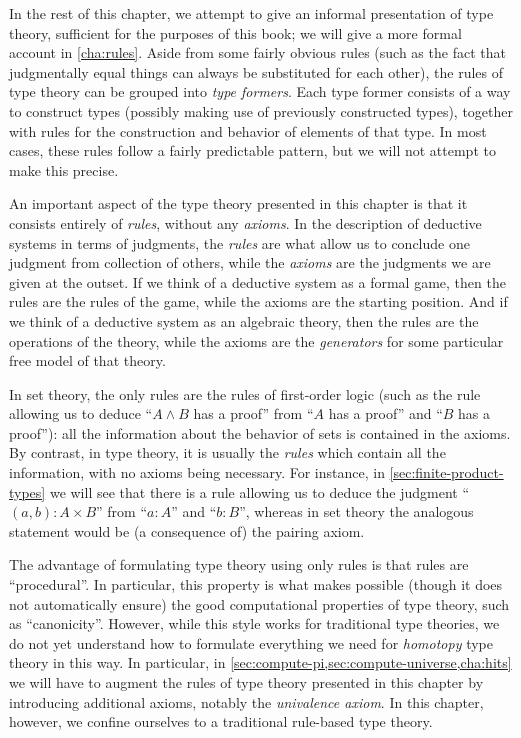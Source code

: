 In the rest of this chapter, we attempt to give an informal presentation of type theory, sufficient for the purposes of this book; we will give a more formal account in \autoref{cha:rules}.
Aside from some fairly obvious rules (such as the fact that judgmentally equal things can always be substituted for each other), the rules of type theory can be grouped into \emph{type formers}.
Each type former consists of a way to construct types (possibly making use of previously constructed types), together with rules for the construction and behavior of elements of that type.
In most cases, these rules follow a fairly predictable pattern, but we will not attempt to make this precise.

%
%
An important aspect of the type theory presented in this chapter is that it consists entirely of \emph{rules}, without any \emph{axioms}.
In the description of deductive systems in terms of judgments, the \emph{rules} are what allow us to conclude one judgment from collection of others, while the \emph{axioms} are the judgments we are given at the outset.
If we think of a deductive system as a formal game, then the rules are the rules of the game, while the axioms are the starting position.
And if we think of a deductive system as an algebraic theory, then the rules are the operations of the theory, while the axioms are the \emph{generators} for some particular free model of that theory.

In set theory, the only rules are the rules of first-order logic (such as the rule allowing us to deduce ``$A\wedge B$ has a proof'' from ``$A$ has a proof'' and ``$B$ has a proof''): all the information about the behavior of sets is contained in the axioms.
By contrast, in type theory, it is usually the \emph{rules} which contain all the information, with no axioms being necessary.
For instance, in \autoref{sec:finite-product-types} we will see that there is a rule allowing us to deduce the judgment ``$(a,b):A\times B$'' from ``$a:A$'' and ``$b:B$'', whereas in set theory the analogous statement would be (a consequence of) the pairing axiom.

The advantage of formulating type theory using only rules is that rules are ``procedural''.
In particular, this property is what makes possible (though it does not automatically ensure) the good computational properties of type theory, such as ``canonicity''.
However, while this style works for traditional type theories, we do not yet understand how to formulate everything we need for \emph{homotopy} type theory in this way.
In particular, in \autoref{sec:compute-pi,sec:compute-universe,cha:hits} we will have to augment the rules of type theory presented in this chapter by introducing additional axioms, notably the \emph{univalence axiom}.
In this chapter, however, we confine ourselves to a traditional rule-based type theory.


